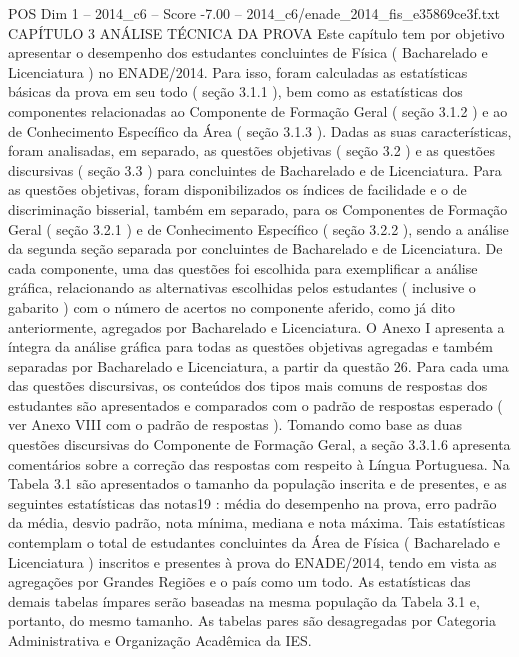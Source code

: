 \begin{textsample}{POS Dim 1 – 2014\_c6 – Score -7.00 – 2014\_c6/enade\_2014\_fis\_e35869ce3f.txt}  \label{ex:f1_pos_422}
CAPÍTULO 3 ANÁLISE TÉCNICA DA PROVA Este capítulo tem por objetivo apresentar o desempenho dos estudantes concluintes de Física ( Bacharelado e Licenciatura ) no ENADE/2014.
Para isso, foram calculadas as estatísticas básicas da prova em seu todo ( seção 3.1.1 ), bem como as estatísticas dos componentes relacionadas ao Componente de Formação Geral ( seção 3.1.2 ) e ao de Conhecimento Específico da Área ( seção 3.1.3 ).
Dadas as suas características, foram analisadas, em separado, as questões objetivas ( seção 3.2 ) e as questões discursivas ( seção 3.3 ) para concluintes de Bacharelado e de Licenciatura.
Para as questões objetivas, foram disponibilizados os índices de facilidade e o de discriminação bisserial, também em separado, para os Componentes de Formação Geral ( seção 3.2.1 ) e de Conhecimento Específico ( seção 3.2.2 ), sendo a análise da segunda seção separada por concluintes de Bacharelado e de Licenciatura.
De cada componente, uma das questões foi escolhida para exemplificar a análise gráfica, relacionando as alternativas escolhidas pelos estudantes ( inclusive o gabarito ) com o número de acertos no componente aferido, como já dito anteriormente, agregados por Bacharelado e Licenciatura.
O Anexo I apresenta a íntegra da análise gráfica para todas as questões objetivas agregadas e também separadas por Bacharelado e Licenciatura, a partir da questão 26.
Para cada uma das questões discursivas, os conteúdos dos tipos mais comuns de respostas dos estudantes são apresentados e comparados com o padrão de respostas esperado ( ver Anexo VIII com o padrão de respostas ).
Tomando como base as duas questões discursivas do Componente de Formação Geral, a seção 3.3.1.6 apresenta comentários sobre a correção das respostas com respeito à Língua Portuguesa.
Na Tabela 3.1 são apresentados o tamanho da população inscrita e de presentes, e as seguintes estatísticas das notas19 : média do desempenho na prova, erro padrão da média, desvio padrão, nota mínima, mediana e nota máxima.
Tais estatísticas contemplam o total de estudantes concluintes da Área de Física ( Bacharelado e Licenciatura ) inscritos e presentes à prova do ENADE/2014, tendo em vista as agregações por Grandes Regiões e o país como um todo.
As estatísticas das demais tabelas ímpares serão baseadas na mesma população da Tabela 3.1 e, portanto, do mesmo tamanho.
As tabelas pares são desagregadas por Categoria Administrativa e Organização Acadêmica da IES.

\end{textsample}
